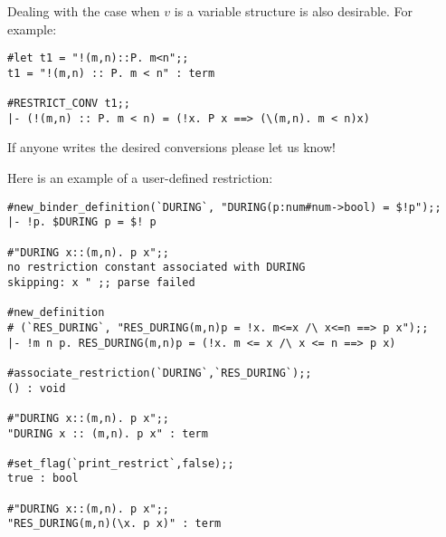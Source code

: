 \begin{hol}
{\small\verb%   RES_FORALL %}$P${\small\verb% (\%}$v$\ml{.}$B$\ml{[}$v$\ml{])  ---->  !}$v$\ml{. }$P$ $v$\ml{ ==> }$B$\ml{[}$v$\ml{]}
\end{hol}

\noindent Dealing with the case when
$v$ is a variable structure is also desirable. For example:

\begin{session}\begin{verbatim}
#let t1 = "!(m,n)::P. m<n";;
t1 = "!(m,n) :: P. m < n" : term

#RESTRICT_CONV t1;;
|- (!(m,n) :: P. m < n) = (!x. P x ==> (\(m,n). m < n)x)

\end{verbatim}\end{session}

\noindent If anyone writes the desired conversions please let us know!

Here is an example of a user-defined restriction:

\begin{session}\begin{verbatim}
#new_binder_definition(`DURING`, "DURING(p:num#num->bool) = $!p");;
|- !p. $DURING p = $! p

#"DURING x::(m,n). p x";;
no restriction constant associated with DURING
skipping: x " ;; parse failed

#new_definition
# (`RES_DURING`, "RES_DURING(m,n)p = !x. m<=x /\ x<=n ==> p x");;
|- !m n p. RES_DURING(m,n)p = (!x. m <= x /\ x <= n ==> p x)

#associate_restriction(`DURING`,`RES_DURING`);;
() : void

#"DURING x::(m,n). p x";;
"DURING x :: (m,n). p x" : term

#set_flag(`print_restrict`,false);;
true : bool

#"DURING x::(m,n). p x";;
"RES_DURING(m,n)(\x. p x)" : term
\end{verbatim}\end{session}


